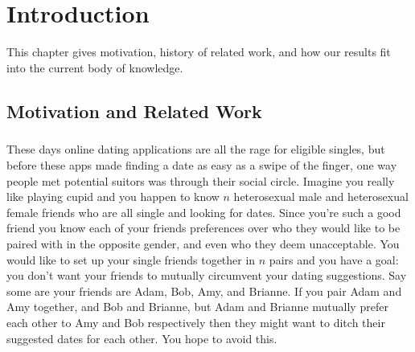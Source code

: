 \chapter{Introduction}
This chapter gives motivation, history of related work, and how our results fit into the current body of knowledge.

\section{Motivation and Related Work}

\paragraph{}
These days online dating applications are all the rage for eligible singles, but before these apps made finding a date as easy as a swipe of the finger, one way people met potential suitors was through their social circle. Imagine you really like playing cupid and you happen to know $n$ heterosexual male and heterosexual female friends who are all single and looking for dates. Since you're such a good friend you know each of your friends preferences over who they would like to be paired with in the opposite gender, and even who they deem unacceptable. You would like to set up your single friends together in $n$ pairs and you have a goal: you don't want your friends to mutually circumvent your dating suggestions. Say some are your friends are Adam, Bob, Amy, and Brianne. If you pair Adam and Amy together, and Bob and Brianne, but Adam and Brianne mutually prefer each other to Amy and Bob respectively then they might want to ditch their suggested dates for each other. You hope to avoid this.

